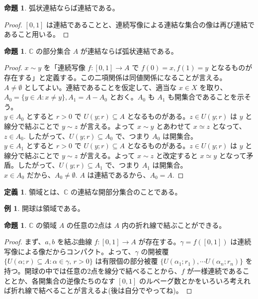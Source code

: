 \documentclass{jsarticle}
\theoremstyle{definition}
\newtheorem*{definition*}{定義}
\newtheorem{proposition}[theorem]{命題}
\newtheorem{example}{例}[section]
\begin{document}
    \begin{proposition} \label{path_connected_implies_connected}
        弧状連結ならば連結である。
    \end{proposition}
    \begin{proof}
        $[0, 1]$ は連結であることと、連続写像による連結な集合の像は再び連結であること用いる。
    \end{proof}
    \vspace{1ex}
  
    \begin{proposition} \label{connected_implies_path_connected}
        $\mathbb{C}$ の部分集合 $A$ が連結ならば弧状連結である。
    \end{proposition}
    \begin{proof}
        $x \sim y$ を「連続写像 $f : [0, 1] \rightarrow A$ で $f(0) = x, f(1) = y$ となるものが存在する」と定義する。この二項関係は同値関係になることが言える。\\
        $A \neq \emptyset$ としてよい。連結であることを仮定して、適当な $x \in X$ を取り、
        $A_0 = \{y \in A : x \neq y\}, A_1 = A - A_0$ とおく。$A_0$ も $A_1$ も開集合であることを示そう。\\
        $y \in A_0$ とすると $r > 0$ で $U(y; r) \subseteq A$ となるものがある。$z \in U(y; r)$ は $y$ と線分で結ぶことで $y \sim z$ が言える。よって $x \sim y$ とあわせて $x \simeq z$ となって、$z \in A_0.$ したがって、$U(y; r) \subseteq A_0$ で、つまり $A_0$ は開集合。\\
        $y \in A_1$ とすると $r > 0$ で $U(y; r) \subseteq A$ となるものがある。$z \in U(y; r)$ は $y$ と線分で結ぶことで $y \sim z$ が言える。よって $x \sim z$ と改定すると $x \simeq y$ となって矛盾。したがって、$U(y; r) \subseteq A_1$ で、つまり $A_1$ は開集合。\\
        $x \in A_0$ だから、$A_0 \neq \emptyset.$ $A$ は連結であるから、$A_0 = A.$
    \end{proof}
    \vspace{1ex}
  
    \begin{definition*} \label{domain} 領域とは、$\mathbb{C}$ の連結な開部分集合のことである。 \end{definition*}
    \begin{example} 開球は領域である。 \end{example}
    \begin{proposition} \label{polylines}
        $\mathbb{C}$ の領域 $A$ の任意の2点は $A$ 内の折れ線で結ぶことができる。
    \end{proposition}
    \begin{proof}
        まず、$a, b$ を結ぶ曲線 $f : [0, 1] \rightarrow A$ が存在する。$\gamma = f([0, 1])$ は連続写像による像だからコンパクト。よって、$\gamma$ の開被覆 $\{ U(\alpha; r) \subseteq A : \alpha \in \gamma, \, r > 0 \}$ は有限個の部分被覆 $\{ U(\alpha_1; r_1), \cdots U(\alpha_n; r_n) \}$ を持つ。開球の中では任意の2点を線分で結べることから、$f$ が一様連続であることとか、各開集合の逆像たちのなす $[0, 1]$ のルベーグ数とかをいろいろ考えれば折れ線で結べることが言えるよ(後は自分でやってね)。
    \end{proof}
    
\end{document}
